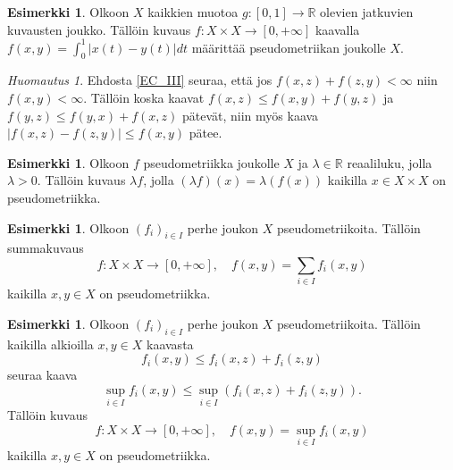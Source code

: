 \documentclass[12pt,a4paper,leqno]{report}
\newcommand{\R}{\mathbb{R}}
\theoremstyle{plain}
\theoremstyle{definition}
\newtheorem{esim}[equation]{Esimerkki}
\theoremstyle{remark}
\newtheorem{huom}[equation]{Huomautus}
\begin{document}
\begin{esim}%
Olkoon $X$ kaikkien muotoa $g\colon [0,1]\rightarrow \R$ olevien jatkuvien kuvausten joukko. %
Tällöin kuvaus $f\colon X\times X\rightarrow [0,+\infty]$ kaavalla $f(x,y)=\int_0^1 |x(t)-y(t)|dt$ määrittää pseudometriikan joukolle $X$.
\end{esim}
\begin{huom}
Ehdosta \ref{EC_III} seuraa, että jos $f(x,z)+f(z,y)<\infty$ niin $f(x,y)<\infty$. Tällöin koska kaavat $f(x,z)\leq f(x,y)+f(y,z)$ ja $f(y,z)\leq f(y,x)+f(x,z)$ pätevät, niin myös kaava $|f(x,z)-f(z,y)|\leq f(x,y)$ pätee.
\end{huom}
\begin{esim}%
Olkoon $f$ pseudometriikka joukolle $X$ ja 
$\lambda\in\R$ reaaliluku, jolla $\lambda >0$. 
Tällöin kuvaus $\lambda f$, jolla 
$(\lambda f) (x)=\lambda (f (x))$ 
kaikilla $x\in X\times X$ on pseudometriikka.
\end{esim}
\begin{esim}%
Olkoon $(f_i)_{i\in I}$ perhe joukon $X$ pseudometriikoita. 
Tällöin summakuvaus 
\begin{equation*}
f\colon X\times X\rightarrow [0,+\infty],\quad
f(x,y)=\sum_{i\in I}f_i(x,y)%
\end{equation*} 
kaikilla $x,y\in X$ 
on pseudometriikka.
\end{esim}
\begin{esim}%
Olkoon $(f_i)_{i\in I}$ perhe joukon $X$ pseudometriikoita. 
Tällöin kaikilla alkioilla $x,y\in X$ kaavasta $$f_i(x,y)\leq f_i(x,z)+f_i(z,y)$$ seuraa kaava $$\sup_{i\in I}f_i(x,y)\leq \sup_{i\in I}\left(f_i(x,z)+f_i(z,y)\right).$$
Tällöin kuvaus 
\begin{equation*}
f\colon X\times X\rightarrow [0,+\infty],\quad
f(x,y)=\sup_{i\in I}f_i(x,y)
\end{equation*} 
kaikilla $x,y\in X$ on pseudometriikka. 
\end{esim}
\end{document}
